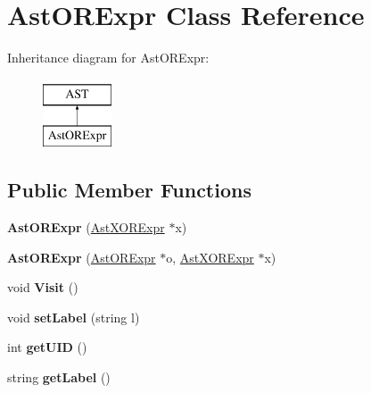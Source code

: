 \hypertarget{classAstORExpr}{\section{Ast\-O\-R\-Expr Class Reference}
\label{classAstORExpr}
}
Inheritance diagram for Ast\-O\-R\-Expr\-:\begin{figure}[H]
\begin{center}
\leavevmode
\includegraphics[height=2.000000cm]{classAstORExpr}
\end{center}
\end{figure}
\subsection*{Public Member Functions}
\begin{DoxyCompactItemize}
\item 
\hypertarget{classAstORExpr_a7e7557c1813587fa1a442cb7b5c5317c}{{\bfseries Ast\-O\-R\-Expr} (\hyperlink{classAstXORExpr}{Ast\-X\-O\-R\-Expr} $\ast$x)}\label{classAstORExpr_a7e7557c1813587fa1a442cb7b5c5317c}

\item 
\hypertarget{classAstORExpr_a928d0f31c99cd5d9eef962544465df7e}{{\bfseries Ast\-O\-R\-Expr} (\hyperlink{classAstORExpr}{Ast\-O\-R\-Expr} $\ast$o, \hyperlink{classAstXORExpr}{Ast\-X\-O\-R\-Expr} $\ast$x)}\label{classAstORExpr_a928d0f31c99cd5d9eef962544465df7e}

\item 
\hypertarget{classAstORExpr_ac442067b01450413dca857727b3af8b3}{void {\bfseries Visit} ()}\label{classAstORExpr_ac442067b01450413dca857727b3af8b3}

\item 
\hypertarget{classAST_a71d680856e95ff89f55d5311a552eba6}{void {\bfseries set\-Label} (string l)}\label{classAST_a71d680856e95ff89f55d5311a552eba6}

\item 
\hypertarget{classAST_ab7a5b1d9f1c2de0d98deb356f724a42c}{int {\bfseries get\-U\-I\-D} ()}\label{classAST_ab7a5b1d9f1c2de0d98deb356f724a42c}

\item 
\hypertarget{classAST_aee029be902fffc927d16ccb03eb922ad}{string {\bfseries get\-Label} ()}\label{classAST_aee029be902fffc927d16ccb03eb922ad}

\end{DoxyCompactItemize}

